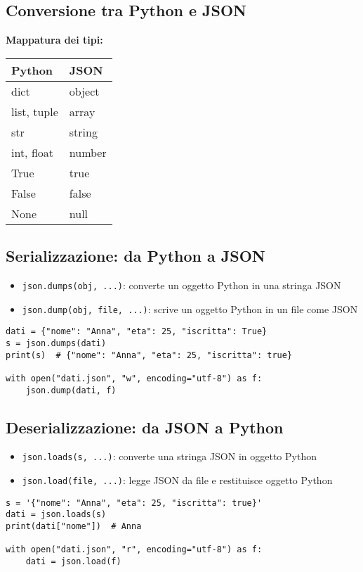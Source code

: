 \documentclass[a4paper,12pt]{article}
\begin{document}
\subsection*{Conversione tra Python e JSON}
\textbf{Mappatura dei tipi:}
\begin{center}
\begin{tabular}{|l|l|}
\hline
\textbf{Python} & \textbf{JSON} \\
\hline
dict            & object \\
list, tuple     & array \\
str             & string \\
int, float      & number \\
True            & true \\
False           & false \\
None            & null \\
\hline
\end{tabular}
\end{center}

\subsection*{Serializzazione: da Python a JSON}
\begin{itemize}
    \item \texttt{json.dumps(obj, ...)}: converte un oggetto Python in una stringa JSON
    \item \texttt{json.dump(obj, file, ...)}: scrive un oggetto Python in un file come JSON
\end{itemize}
\begin{lstlisting}
dati = {"nome": "Anna", "eta": 25, "iscritta": True}
s = json.dumps(dati)
print(s)  # {"nome": "Anna", "eta": 25, "iscritta": true}

with open("dati.json", "w", encoding="utf-8") as f:
    json.dump(dati, f)
\end{lstlisting}

\subsection*{Deserializzazione: da JSON a Python}
\begin{itemize}
    \item \texttt{json.loads(s, ...)}: converte una stringa JSON in oggetto Python
    \item \texttt{json.load(file, ...)}: legge JSON da file e restituisce oggetto Python
\end{itemize}
\begin{lstlisting}
s = '{"nome": "Anna", "eta": 25, "iscritta": true}'
dati = json.loads(s)
print(dati["nome"])  # Anna

with open("dati.json", "r", encoding="utf-8") as f:
    dati = json.load(f)
\end{lstlisting}
\end{document}
